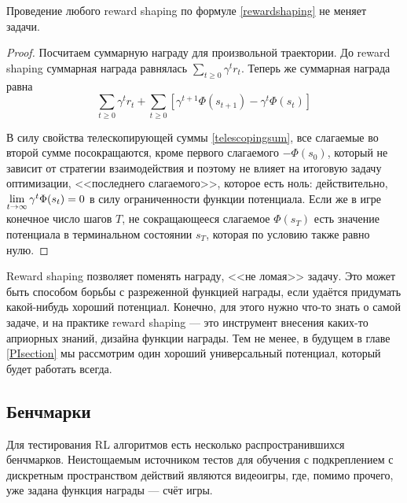 \begin{theorem}
Проведение любого reward shaping по формуле \eqref{rewardshaping} не меняет задачи.

\begin{proof} Посчитаем суммарную награду для произвольной траектории. До reward shaping суммарная награда равнялась $\sum\limits_{t \ge 0} \gamma^t r_t$. Теперь же суммарная награда равна
\begin{equation*}
\sum_{t \ge 0} \gamma^t r_t + \sum_{t \ge 0} \left[ \gamma^{t+1} \Phi(s_{t+1}) - \gamma^{t} \Phi(s_t) \right]
\end{equation*}

В силу свойства телескопирующей суммы \eqref{telescopingsum}, все слагаемые во второй сумме посокращаются, кроме первого слагаемого $-\Phi(s_0)$, который не зависит от стратегии взаимодействия и поэтому не влияет на итоговую задачу оптимизации, <<последнего слагаемого>>, которое есть ноль: действительно, $\lim\limits_{t \to \infty} \gamma^{t} \Phi(s_t) \HM= 0$ в силу ограниченности функции потенциала. Если же в игре конечное число шагов $T$, не сокращающееся слагаемое $\Phi(s_T)$ есть значение потенциала в терминальном состоянии $s_T$, которая по условию также равно нулю.
\end{proof}
\end{theorem}

Reward shaping позволяет поменять награду, <<не ломая>> задачу. Это может быть способом борьбы с разреженной функцией награды, если удаётся придумать какой-нибудь хороший потенциал. Конечно, для этого нужно что-то знать о самой задаче, и на практике reward shaping --- это инструмент внесения каких-то априорных знаний, дизайна функции награды. Тем не менее, в будущем в главе \ref{PIsection} мы рассмотрим один хороший универсальный потенциал, который будет работать всегда.

\subsection{Бенчмарки}

Для тестирования RL алгоритмов есть несколько распространившихся бенчмарков. Неистощаемым источником тестов для обучения с подкреплением с дискретным пространством действий являются видеоигры, где, помимо прочего, уже задана функция награды --- счёт игры.

